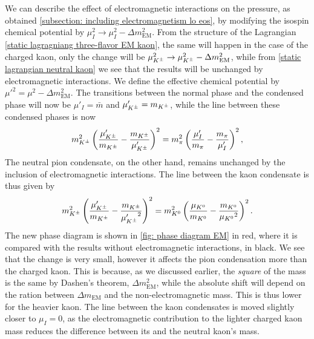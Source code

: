 We can describe the effect of electromagnetic interactions on the pressure, as obtained \autoref{subsection: including electromagnetism lo eos}, by modifying the isospin chemical potential by $\mu^2_I \rightarrow \mu^2_I - \Delta m_\text{EM}^2$.
From the structure of the Lagrangian \autoref{static lagragniang three-flavor EM kaon}, the same will happen in the case of the charged kaon, only the change will be $\mu^2_{K^\pm} \rightarrow \mu^2_{K^\pm} - \Delta m_\text{EM}^2$, while from \autoref{static lagrangian neutral kaon} we see that the results will be unchanged by electromagnetic interactions.
We define the effective chemical potential by ${\mu'}^2 = \mu^2 - \Delta m_\text{EM}^2$.
The transitions between the normal phase and the condensed phase will now be $\mu'_I = \bar m$ and $\mu_{K^\pm}' = m_{K^\pm}$, while the line between these condensed phases is now
%
\begin{equation}
    m_{K^\pm}^2
    \left(
         \frac{{\mu_{K^\pm}'}}{m_{K^\pm}}
         - \frac{m_{K^\pm}}{{\mu_{K^\pm}'}} 
        \right)^2
    =
    m_\pi^2  
    \left( 
        \frac{{\mu_I'}}{m_\pi}
        - \frac{m_\pi}{{\mu_I'}}
    \right)^2,
\end{equation}
%
The neutral pion condensate, on the other hand, remains unchanged by the inclusion of electromagnetic interactions.
The line between the kaon condensate is thus given by
%
\begin{equation}
    m_{K^\pm}^2
    \left(
         \frac{{\mu_{K^\pm}'}}{m_{K^\pm}}
         - \frac{m_{K^\pm}}{{\mu_{K^\pm}'}^2} 
        \right)^2
    =
    m_{K^0}^2  
    \left( 
        \frac{{\mu_{K^0}}}{m_{K^0}}
        - \frac{m_{K^0}}{{\mu_{K^0}}^2}  
    \right)^2.
\end{equation}
%
The new phase diagram is shown in \autoref{fig: phase diagram EM} in red, where it is compared with the results without electromagnetic interactions, in black.
We see that the change is very small, however it affects the pion condensation more than the charged kaon.
This is because, as we discussed earlier, the \emph{square} of the mass is the same by Dashen's theorem, $\Delta m_\text{EM}^2$, while the absolute shift will depend on the ration between $\Delta m_\text{EM}$ and the non-electromagnetic mass.
This is thus lower for the heavier kaon.
The line between the kaon condensates is moved slightly closer to $\mu_I = 0$, as the electromagnetic contribution to the lighter charged kaon mass reduces the difference between its and the neutral kaon's mass.

